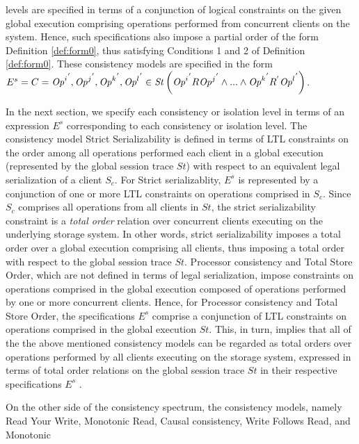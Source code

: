 \documentclass{sig-alternate-05-2015}
\begin{document}
   levels are  specified in terms of a conjunction of logical constraints on the given global execution comprising operations performed from
   concurrent clients on the system. Hence, such specifications also impose a partial order of the form Definition \ref{def:form0},  thus satisfying Conditions 1 and 2 of Definition \ref{def:form0}.  These consistency models are specified in the form $E^s = C =  {\mathit{Op}^i}^{'}, {\mathit{Op}^j}^{'}, {\mathit{Op}^k}^{'}, {\mathit{Op}^l}^{'}  \in \mathit{St} \\
         \left( {\mathit{Op}^i}^{'} R {\mathit{Op}^j}^{'} \wedge ... \wedge  {\mathit{Op}^k}^{'} R^{'} {\mathit{Op}^l}^{'} \right)$.
     \par  In the next section, we specify each consistency or isolation level in terms of an expression $E^s$ corresponding to each consistency or isolation level.
 The consistency model Strict
   Serializability is defined in terms of LTL constraints on the order among all operations performed each client in a global
   execution (represented by the global session trace $\mathit{St}$) with respect to an equivalent legal serialization of a client $S_c$. For Strict serializablity, $E^s$ is
   represented by a
   conjunction of one
   or more LTL constraints on operations comprised in $S_c$. Since $S_c$ comprises all operations from all clients in $\mathit{St}$, the strict serializability constraint is a \emph{total order} relation over concurrent clients executing on the underlying storage system.  In other words, strict serializability imposes a total order over a global execution comprising all clients, thus imposing a total order with respect to the global session trace $\mathit{St}$.   Processor consistency and Total Store Order, which are not defined in terms
   of legal serialization, impose constraints on operations comprised in the global execution composed of operations
   performed by one or more concurrent clients. Hence, for Processor consistency and Total Store Order, the specifications $E^s$ comprise a
   conjunction of LTL constraints on operations comprised in the global execution $\mathit{St}$. This, in turn, implies that all of the the above mentioned consistency models can be regarded as total orders over operations performed by all clients executing on the storage system, expressed in terms of total order relations on the global session trace  $\mathit{St}$ in their respective specifications $E^s$ . 
   \par On the other side of the consistency spectrum, the consistency models, namely Read Your Write, Monotonic Read, Causal consistency, Write Follows Read, and Monotonic
\end{document}
